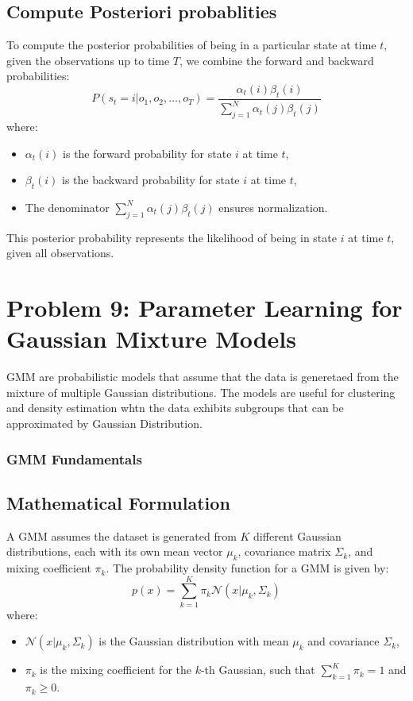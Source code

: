 \documentclass{article}
\begin{document}
\subsection*{Compute Posteriori probablities}
To compute the posterior probabilities of being in a particular state at time \(t\), given the observations up to time \(T\), we combine the forward and backward probabilities:
\[
P(s_t = i | o_1, o_2, \ldots, o_T) = \frac{\alpha_t(i) \beta_t(i)}{\sum_{j=1}^{N} \alpha_t(j) \beta_t(j)}
\]
where:
\begin{itemize}
    \item \(\alpha_t(i)\) is the forward probability for state \(i\) at time \(t\),
    \item \(\beta_t(i)\) is the backward probability for state \(i\) at time \(t\),
    \item The denominator \(\sum_{j=1}^{N} \alpha_t(j) \beta_t(j)\) ensures normalization.
\end{itemize}
This posterior probability represents the likelihood of being in state \(i\) at time \(t\), given all observations.

\clearpage
\section*{Problem 9: Parameter Learning for Gaussian Mixture Models}
GMM are probabilistic models that assume that the data is generetaed from the mixture of multiple Gaussian distributions. The models are useful
for clustering and density estimation whtn the data exhibits subgroups that can be approximated by Gaussian Distribution.

\subsubsection*{GMM Fundamentals}
\subsection*{Mathematical Formulation}
A GMM assumes the dataset is generated from \(K\) different Gaussian distributions, each with its own mean vector \(\mu_k\), covariance matrix \(\Sigma_k\), and mixing coefficient \(\pi_k\). The probability density function for a GMM is given by:
\[
p(x) = \sum_{k=1}^{K} \pi_k \mathcal{N}(x | \mu_k, \Sigma_k)
\]
where:
\begin{itemize}
    \item \(\mathcal{N}(x | \mu_k, \Sigma_k)\) is the Gaussian distribution with mean \(\mu_k\) and covariance \(\Sigma_k\),
    \item \(\pi_k\) is the mixing coefficient for the \(k\)-th Gaussian, such that \(\sum_{k=1}^{K} \pi_k = 1\) and \(\pi_k \geq 0\).
\end{itemize}
\end{document}
